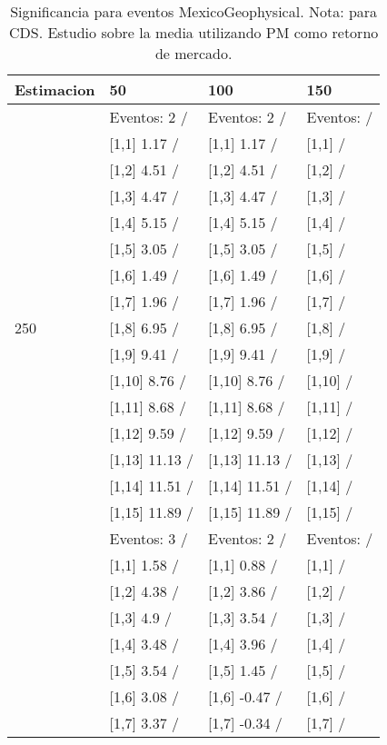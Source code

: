 \begin{table}

\caption{Significancia para eventos MexicoGeophysical. Nota: para CDS. Estudio sobre la media utilizando PM como retorno de mercado.}
\centering
\begin{tabular}[t]{llll}
\toprule
Estimacion & 50 & 100 & 150\\
\midrule
 & Eventos:  2 / & Eventos:  2 / & Eventos:   /\\
 & {}[1,1] 1.17  / & {}[1,1] 1.17  / & {}[1,1]  /\\
 & {}[1,2] 4.51  / & {}[1,2] 4.51  / & {}[1,2]  /\\
 & {}[1,3] 4.47  / & {}[1,3] 4.47  / & {}[1,3]  /\\
 & {}[1,4] 5.15  / & {}[1,4] 5.15  / & {}[1,4]  /\\
\addlinespace
 & {}[1,5] 3.05  / & {}[1,5] 3.05  / & {}[1,5]  /\\
 & {}[1,6] 1.49  / & {}[1,6] 1.49  / & {}[1,6]  /\\
 & {}[1,7] 1.96  / & {}[1,7] 1.96  / & {}[1,7]  /\\
250 & {}[1,8] 6.95  / & {}[1,8] 6.95  / & {}[1,8]  /\\
 & {}[1,9] 9.41  / & {}[1,9] 9.41  / & {}[1,9]  /\\
\addlinespace
 & {}[1,10] 8.76  / & {}[1,10] 8.76  / & {}[1,10]  /\\
 & {}[1,11] 8.68  / & {}[1,11] 8.68  / & {}[1,11]  /\\
 & {}[1,12] 9.59  / & {}[1,12] 9.59  / & {}[1,12]  /\\
 & {}[1,13] 11.13  / & {}[1,13] 11.13  / & {}[1,13]  /\\
 & {}[1,14] 11.51  / & {}[1,14] 11.51  / & {}[1,14]  /\\
\addlinespace
 & {}[1,15] 11.89  / & {}[1,15] 11.89  / & {}[1,15]  /\\
 & Eventos:  3 / & Eventos:  2 / & Eventos:   /\\
 & {}[1,1] 1.58  / & {}[1,1] 0.88  / & {}[1,1]  /\\
 & {}[1,2] 4.38  / & {}[1,2] 3.86  / & {}[1,2]  /\\
 & {}[1,3] 4.9  / & {}[1,3] 3.54  / & {}[1,3]  /\\
\addlinespace
 & {}[1,4] 3.48  / & {}[1,4] 3.96  / & {}[1,4]  /\\
 & {}[1,5] 3.54  / & {}[1,5] 1.45  / & {}[1,5]  /\\
 & {}[1,6] 3.08  / & {}[1,6] -0.47  / & {}[1,6]  /\\
 & {}[1,7] 3.37  / & {}[1,7] -0.34  / & {}[1,7]  /\\

\end{tabular}
\end{table}
